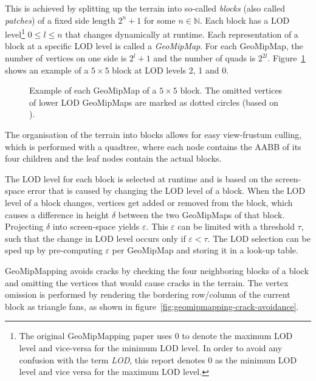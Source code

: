 This is achieved by splitting up the terrain into so-called \textit{blocks} (also called \textit{patches}) of a fixed side length $2^n + 1$ for some $n \in \mathbb{N}$.
Each block has a LOD level\footnote{The original GeoMipMapping paper uses 0 to denote the maximum LOD level and vice-versa for the minimum LOD level. In order to avoid any confusion with the term \textit{LOD}, this report denotes 0 as the minimum LOD level and vice versa for the maximum LOD level.} $0\leq l \leq n$ that changes dynamically at runtime.
Each representation of a block at a specific LOD level is called a \textit{GeoMipMap}.
For each GeoMipMap, the number of vertices on one side is $2^{l}+1$ and the number of quads is $2^{2l}$.
Figure~\ref{fig:geomipmapping-patch-example} shows an example of a $5 \times 5$ block at LOD levels 2, 1 and 0.

\begin{figure}[H]
  \centering
  \qquad
  \qquad
  \caption{Example of each GeoMipMap of a $5 \times 5$ block. The omitted vertices of lower LOD GeoMipMaps are marked as dotted circles (based on \cite{geomipmapping}).}\label{fig:geomipmapping-patch-example}
\end{figure}

The organisation of the terrain into blocks allows for easy view-frustum culling, which is performed 
with a quadtree, where each node contains the AABB of its four children and the leaf nodes 
contain the actual blocks.

The LOD level for each block is selected at runtime and is based on the 
screen-space error that is caused by changing the LOD level of a block.
When the LOD level of a block changes, vertices get added or removed from the block,
which causes a difference in height $\delta$ between the two GeoMipMaps of that block. Projecting $\delta$ into 
screen-space yields $\varepsilon$. 
This $\varepsilon$ can be limited with a threshold $\tau$, such that 
the change in LOD level occurs only if $\varepsilon < \tau$.
The LOD selection can be sped up by pre-computing $\varepsilon$ per GeoMipMap and storing it in a look-up table.

GeoMipMapping avoids cracks by checking the four neighboring blocks
of a block and omitting the vertices that would cause cracks in the terrain.
The vertex omission is performed by rendering the bordering row/column of the current block
as triangle fans, as shown in figure~\ref{fig:geomipmapping-crack-avoidance}.

